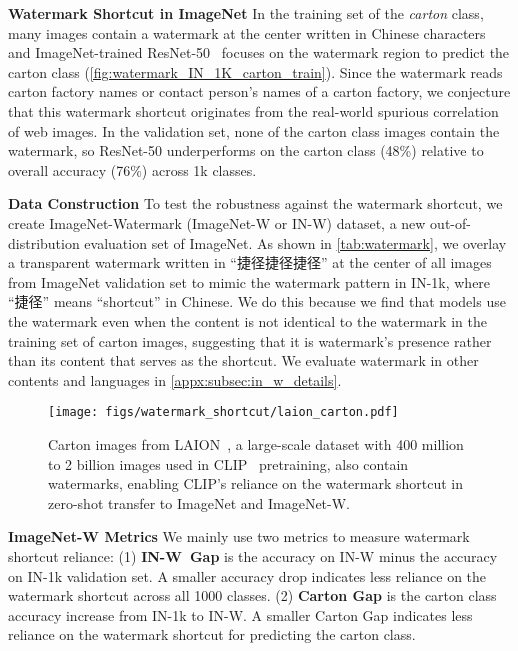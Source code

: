 \documentclass[10pt,twocolumn,letterpaper]{article}
\begin{document}
\noindent \textbf{Watermark Shortcut in ImageNet} \quad In the training set of the \textit{carton} class, many images contain a watermark at the center written in Chinese characters and ImageNet-trained ResNet-50~\cite{he2016IEEEConf.Comput.Vis.PatternRecognit.CVPRDeep} focuses on the watermark region to predict the carton class (\cref{fig:watermark_IN_1K_carton_train}). Since the watermark reads carton factory names or contact person's names of a carton factory, we conjecture that this watermark shortcut originates from the real-world spurious correlation of web images. In the validation set, none of the carton class images contain the watermark, so ResNet-50 underperforms on the carton class (48\%) relative to overall accuracy (76\%) across 1k classes.


\begin{CJK*}{UTF8}{gbsn}
\noindent \textbf{Data Construction} \quad To test the robustness against the watermark shortcut, we create ImageNet-Watermark (ImageNet-W or IN-W) dataset, a new out-of-distribution evaluation set of ImageNet. As shown in \cref{tab:watermark}, we overlay a transparent watermark written in ``捷径捷径捷径'' at the center of all images from ImageNet validation set to mimic the watermark pattern in IN-1k, where ``捷径'' means ``shortcut'' in Chinese.
We do this because we find that models use the watermark even when the content is not identical to the watermark in the training set of carton images, suggesting that it is watermark's presence rather than its content that serves as the shortcut. We evaluate watermark in other contents and languages in \cref{appx:subsec:in_w_details}.
\end{CJK*}

\begin{figure}[t]
  \centering
  \texttt{[image: figs/watermark\_shortcut/laion\_carton.pdf]}
   \caption{Carton images from LAION~\cite{schuhmann2021Adv.NeuralInf.Process.Syst.WorkshopLAION400M,schuhmann2022LAION5B}, a large-scale dataset with 400 million to 2 billion images used in CLIP~\cite{radford2021Int.Conf.Mach.Learn.Learning} pretraining, also contain watermarks, enabling CLIP's reliance on the watermark shortcut in zero-shot transfer to ImageNet and ImageNet-W.}
   \label{fig:laion_carton}
   \vspace{-6mm}
\end{figure}

\noindent \textbf{ImageNet-W Metrics} \quad We mainly use two metrics to measure watermark shortcut reliance:
(1) \textbf{IN-W~Gap} is the accuracy on IN-W minus the accuracy on IN-1k validation set. A smaller accuracy drop indicates less reliance on the watermark shortcut across all 1000 classes. (2) \textbf{Carton Gap} is the carton class accuracy increase from IN-1k to IN-W. A smaller Carton Gap indicates less reliance on the watermark shortcut for predicting the carton class.
\end{document}
